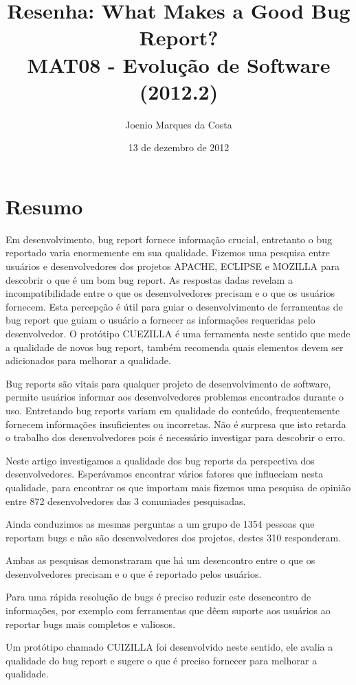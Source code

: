 \documentclass[12pt]{article}
\title{Resenha: What Makes a Good Bug Report?\cite{GoodBugReport} \\
 \large MAT08 - Evolução de Software (2012.2)}
\author{Joenio Marques da Costa}
\date{13 de dezembro de 2012}
\begin{document}
\maketitle

\section*{Resumo}

Em desenvolvimento, bug report fornece informação crucial, entretanto o bug reportado varia enormemente em sua qualidade.
Fizemos uma pesquisa entre usuários e desenvolvedores dos projetos APACHE, ECLIPSE e MOZILLA para descobrir o que é um bom bug report.
As respostas dadas revelam a incompatibilidade entre o que os desenvolvedores precisam e o que os usuários fornecem.
Esta percepção é útil para guiar o desenvolvimento de ferramentas de bug report que guiam o usuário a fornecer as informações requeridas pelo desenvolvedor.
O protótipo CUEZILLA é uma ferramenta neste sentido que mede a qualidade de novos bug report, também recomenda quais elementos devem ser adicionados para melhorar a qualidade.


Bug reports são vitais para qualquer projeto de desenvolvimento de software, permite usuários informar aos desenvolvedores problemas encontrados durante o uso. Entretando bug reports variam em qualidade do conteúdo, frequentemente fornecem informações insuficientes ou incorretas. Não é surpresa que isto retarda o trabalho dos desenvolvedores pois é necessário investigar para descobrir o erro.

Neste artigo investigamos a qualidade dos bug reports da perspectiva dos desenvolvedores. Esperávamos encontrar vários fatores que influeciam nesta qualidade, para encontrar os que importam mais fizemos uma pesquisa de opinião entre 872 desenvolvedores das 3 comuniades pesquisadas.

Ainda conduzimos as mesmas perguntas a um grupo de 1354 pessoas que reportam bugs e não são desenvolvedores dos projetos, destes 310 responderam.

Ambas as pesquisas demonstraram que há um desencontro entre o que os desenvolvedores precisam e o que é reportado pelos usuários.

Para uma rápida resolução de bugs é preciso reduzir este desencontro de informações, por exemplo com ferramentas que dêem suporte aos usuários ao reportar bugs mais completos e valiosos.

Um protótipo chamado CUIZILLA foi desenvolvido neste sentido, ele avalia a qualidade do bug report e sugere o que é preciso fornecer para melhorar a qualidade.
\end{document}
